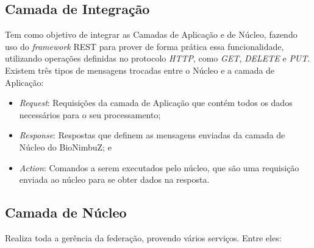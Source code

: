 	\subsection{Camada de Integração} Tem como objetivo de integrar as Camadas de Aplicação e de Núcleo, fazendo uso do \textit{framework} \acrshort{REST} para prover de forma prática essa funcionalidade, utilizando operações definidas no protocolo \textit{HTTP}, como \textit{GET}, \textit{DELETE} e \textit{PUT}.
	Existem três tipos de mensagens trocadas entre o Núcleo e a camada de Aplicação:
	\begin{itemize}
		\item \textit{Request}: Requisições da camada de Aplicação que contém todos os dados necessários para o seu processamento;
		\item \textit{Response}: Respostas que definem as mensagens enviadas da camada de Núcleo do BioNimbuZ; e
		\item \textit{Action}: Comandos a serem executados pelo núcleo, que são uma requisição enviada ao núcleo para se obter dados na resposta.
	\end{itemize}
	
	\subsection{Camada de Núcleo} Realiza toda a gerência da federação, provendo vários serviços. Entre eles:

